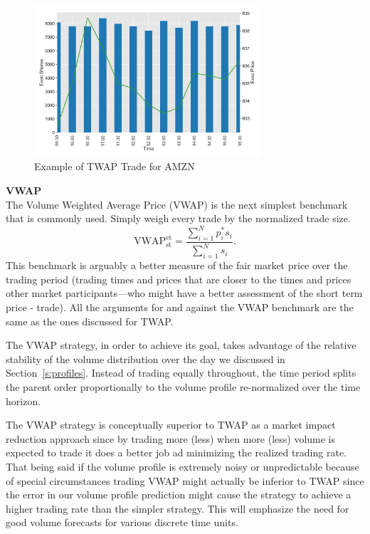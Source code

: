         \begin{figure}[!ht]
        \centering
        \includegraphics[width=0.75\textwidth]{chapters/chapter_exec_models/figures/twap.png} 
        \caption{Example of TWAP Trade for AMZN \label{fig:vwap}}
        \end{figure}


\noindent\textbf{VWAP} \\


The Volume Weighted Average Price (VWAP) is the next simplest benchmark that is commonly used. Simply weigh every trade by the normalized trade size.
        \begin{equation} \label{eq:vwapstet}
        \text{VWAP}_{\text{st}} ^{\text{et}}= \dfrac{ \sum_{i=1}^N p_i^* s_i }{ \sum_{i=1}^N s_i }.
        \end{equation}
This benchmark  is arguably a better measure of the fair market price over the trading period (trading times and prices that are closer to the times and prices other market participants---who might have a better assessment of the short term price - trade). All the arguments for and against the VWAP benchmark are the same as the ones discussed for TWAP.


The VWAP strategy, in order to achieve its goal, takes advantage of the relative stability of the volume distribution over the day we discussed in Section~\ref{s:profiles}. Instead of trading equally throughout, the time period splits the parent order proportionally to the volume profile re-normalized over the time horizon.


The VWAP strategy is conceptually superior to TWAP as a market impact reduction approach since by trading more (less) when more  (less) volume is expected to trade it does a better job ad minimizing the realized trading rate. That being said if the volume profile is extremely noisy or unpredictable because of special circumstances trading VWAP might actually be inferior to TWAP since the error in our volume profile prediction might cause the strategy to achieve a higher trading rate than the simpler strategy. This will emphasize the need for good volume forecasts for various discrete time units.


